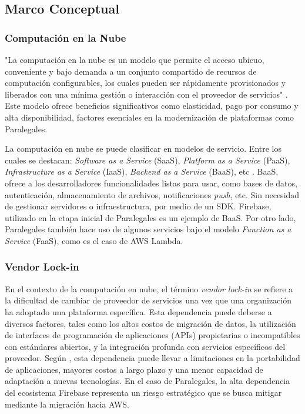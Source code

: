 \subsection{Marco Conceptual}

\subsubsection{Computación en la Nube}

"La computación en la nube es un modelo que permite el acceso ubicuo, conveniente y bajo demanda a un conjunto compartido de recursos de computación configurables, los cuales pueden ser rápidamente provisionados y liberados con una mínima gestión o interacción con el proveedor de servicios" \cite{Mell2011}. Este modelo ofrece beneficios significativos como elasticidad, pago por consumo y alta disponibilidad, factores esenciales en la modernización de plataformas como Paralegales.

La computación en nube se puede clasificar en modelos de servicio. Entre los cuales se destacan: \textit{Software as a Service} (SaaS), \textit{Platform as a Service} (PaaS), \textit{Infrastructure as a Service} (IaaS), \textit{Backend as a Service} (BaaS), etc \cite{Mell2011}. BaaS, ofrece a los desarrolladores funcionalidades listas para usar, como bases de datos, autenticación, almacenamiento de archivos, notificaciones \textit{push}, etc. Sin necesidad de gestionar servidores o infraestructura, por medio de un SDK. Firebase, utilizado en la etapa inicial de Paralegales es un ejemplo de BaaS. Por otro lado, Paralegales también hace uso de algunos servicios bajo el modelo \textit{Function as a Service} (FaaS), como es el caso de AWS Lambda.

\subsubsection{Vendor Lock-in}

En el contexto de la computación en nube, el término \textit{vendor lock-in} se refiere a la dificultad de cambiar de proveedor de servicios una vez que una organización ha adoptado una plataforma específica.  Esta dependencia puede deberse a diversos factores, tales como los altos costos de migración de datos, la utilización de interfaces de programación de aplicaciones (APIs) propietarias o incompatibles con estándares abiertos, y la integración profunda con servicios específicos del proveedor. Según \textcite{OparaMartins2016}, esta dependencia puede llevar a limitaciones en la portabilidad de aplicaciones, mayores costos a largo plazo y una menor capacidad de adaptación a nuevas tecnologías. En el caso de Paralegales, la alta dependencia del ecosistema Firebase representa un riesgo estratégico que se busca mitigar mediante la migración hacia AWS.

